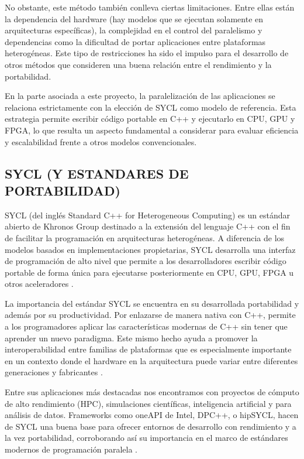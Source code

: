 No obstante, este método también conlleva ciertas limitaciones. Entre ellas están la dependencia del hardware (hay modelos que se ejecutan solamente en arquitecturas específicas), la complejidad en el control del paralelismo y dependencias como la dificultad de portar aplicaciones entre plataformas heterogéneas. Este tipo de restricciones ha sido el impulso para el desarrollo de otros métodos que consideren una buena relación entre el rendimiento y la portabilidad.

En la parte asociada a este proyecto, la paralelización de las aplicaciones se relaciona estrictamente con la elección de SYCL como modelo de referencia. Esta estrategia permite escribir código portable en C++ y ejecutarlo en CPU, GPU y FPGA, lo que resulta un aspecto fundamental a considerar para evaluar eficiencia y escalabilidad frente a otros modelos convencionales.

\subsection{SYCL (Y ESTANDARES DE PORTABILIDAD)}

SYCL (del inglés Standard C++ for Heterogeneous Computing) es un estándar abierto de Khronos Group destinado a la extensión del lenguaje C++ con el fin de facilitar la programación en arquitecturas heterogéneas. A diferencia de los modelos basados en implementaciones propietarias, SYCL desarrolla una interfaz de programación de alto nivel que permite a los desarrolladores escribir código portable de forma única para ejecutarse posteriormente en CPU, GPU, FPGA u otros aceleradores \cite{the_khronos_group_inc_sycl_2025}.

La importancia del estándar SYCL se encuentra en su desarrollada portabilidad y además por su productividad. Por enlazarse de manera nativa con C++, permite a los programadores aplicar las características modernas de C++ sin tener que aprender un nuevo paradigma. Este mismo hecho ayuda a promover la interoperabilidad entre familias de plataformas que es especialmente importante en un contexto donde el hardware en la arquitectura puede variar entre diferentes generaciones y fabricantes \cite{reinders_data_2021}.

Entre sus aplicaciones más destacadas nos encontramos con proyectos de cómputo de alto rendimiento (HPC), simulaciones científicas, inteligencia artificial y para análisis de datos. Frameworks como oneAPI de Intel, DPC++, o hipSYCL, hacen de SYCL una buena base para ofrecer entornos de desarrollo con rendimiento y a la vez portabilidad, corroborando así su importancia en el marco de estándares modernos de programación paralela \cite{intel_technologies_intel_2025}\cite{alpay_hipsycl_2021}.

